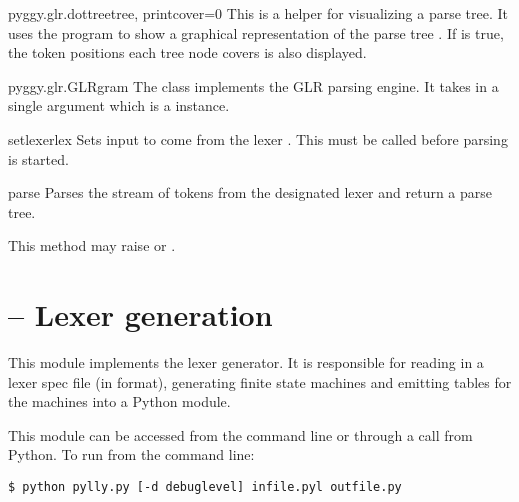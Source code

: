 \begin{funcdesc}{pyggy.glr.dottree}{tree, printcover=0}
This is a helper for visualizing a parse tree.  It uses the
 program to show a graphical representation of the
parse tree .  If  is true, the
token positions each tree node covers is also displayed.
\end{funcdesc}

\begin{classdesc}{pyggy.glr.GLR}{gram}
The  class implements the GLR parsing engine.  It takes
in a single argument which is a  instance.

\begin{methoddesc}{setlexer}{lex}
Sets input to come from the lexer .  This must be called
before parsing is started.
\end{methoddesc}

\begin{methoddesc}{parse}{}
Parses the stream of tokens from the designated lexer and return
a parse tree.

This method may raise  or .
\end{methoddesc}
\end{classdesc}



\section{ -- Lexer generation}

This module implements the lexer generator.  It is responsible for
reading in a lexer spec file (in  format), generating
finite state machines and emitting tables for the machines into a
Python module.

This module can be accessed from the command line or through a call
from Python.  To run from the command line:

\begin{verbatim}
$ python pylly.py [-d debuglevel] infile.pyl outfile.py
\end{verbatim}

